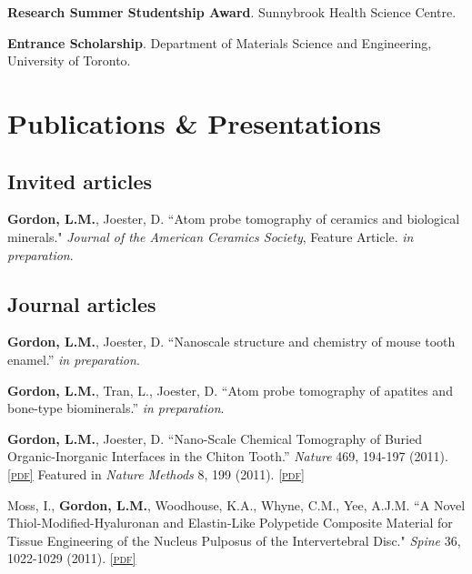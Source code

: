 \textbf{Research Summer Studentship Award}. Sunnybrook Health Science Centre.

\textbf{Entrance Scholarship}. Department of Materials Science and Engineering, University of Toronto.
\endgroup

\section*{Publications \& Presentations}

\subsection*{Invited articles}
\textbf{Gordon, L.M.}, Joester, D. ``Atom probe tomography of ceramics and biological minerals." \emph{Journal of the American Ceramics Society}, Feature Article. \emph{in preparation}.

\begingroup\setlength{\parskip}{0.15cm}
\endgroup

\subsection*{Journal articles}
\textbf{Gordon, L.M.}, Joester, D. “Nanoscale structure and chemistry of mouse tooth enamel.” \emph{in preparation}.

\begingroup\setlength{\parskip}{0.15cm}
%
\textbf{Gordon, L.M.}, Tran, L., Joester, D. “Atom probe tomography of apatites and bone-type biominerals.” \emph{in preparation}.

\textbf{Gordon, L.M.}, Joester, D. “Nano-Scale Chemical Tomography of Buried Organic-Inorganic Interfaces in the Chiton Tooth.” \emph{Nature} 469, 194-197 (2011). \href{http://www.lylegordon.ca/papers/Gordon_and_Joester_Nature_2011.pdf}{\textsc{\footnotesize{[pdf]}}} Featured in \emph{Nature Methods} 8, 199 (2011). \href{http://www.lylegordon.ca/papers/nmeth0311-199.pdf}{\textsc{\footnotesize{[pdf]}}}

Moss, I., \textbf{Gordon, L.M.}, Woodhouse, K.A., Whyne, C.M., Yee, A.J.M. ``A Novel Thiol-Modified-Hyaluronan and Elastin-Like Polypetide Composite Material for Tissue Engineering of the Nucleus Pulposus of the Intervertebral Disc." \emph{Spine} 36, 1022-1029 (2011). \href{http://www.lylegordon.ca/papers/Moss_et_al_Spine_2011.pdf}{\textsc{\footnotesize{[pdf]}}}

